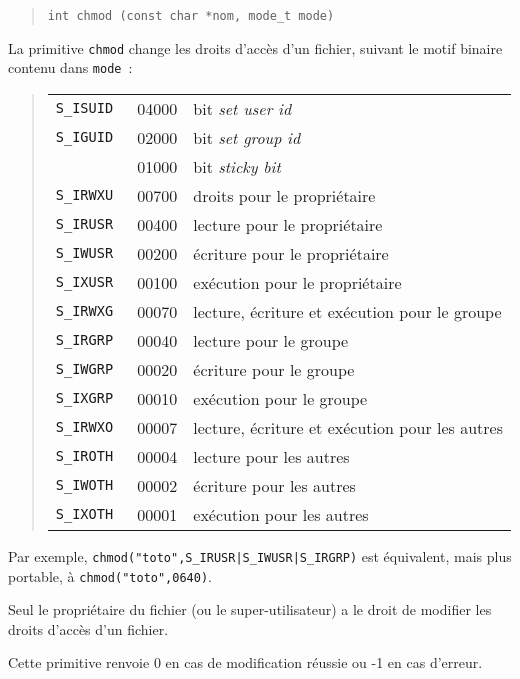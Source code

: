 \documentclass [twoside] {report}
\begin{document}
\begin {quote}
\begin {verbatim}
int chmod (const char *nom, mode_t mode)
\end{verbatim}
\end {quote}

La primitive {\tt chmod} change les droits d'accès
d'un fichier, suivant le motif binaire contenu
dans {\tt mode}~:

\begin {quote}
    \begin {tabular} {|lll|} \hline
	\tt S\_ISUID & 04000 & bit {\it set user id} \\
	\tt S\_IGUID & 02000 & bit {\it set group id} \\
	             & 01000 & bit {\it sticky bit} \\
	\tt S\_IRWXU & 00700 & droits pour le propriétaire \\
	\tt S\_IRUSR & 00400 & lecture pour le propriétaire \\
	\tt S\_IWUSR & 00200 & écriture pour le propriétaire \\
	\tt S\_IXUSR & 00100 & exécution pour le propriétaire \\
	\tt S\_IRWXG & 00070 & lecture, écriture et exécution pour le groupe \\
	\tt S\_IRGRP & 00040 & lecture pour le groupe \\
	\tt S\_IWGRP & 00020 & écriture pour le groupe \\
	\tt S\_IXGRP & 00010 & exécution pour le groupe \\
	\tt S\_IRWXO & 00007 & lecture, écriture et exécution pour les autres \\
	\tt S\_IROTH & 00004 & lecture pour les autres \\
	\tt S\_IWOTH & 00002 & écriture pour les autres \\
	\tt S\_IXOTH & 00001 & exécution pour les autres \\ \hline
    \end {tabular}
\end {quote}

Par exemple, \verb/chmod("toto",S_IRUSR|S_IWUSR|S_IRGRP)/ est
équivalent, mais plus portable, à \verb/chmod("toto",0640)/.

Seul le propriétaire du fichier (ou le
super-utilisateur) a le droit de modifier les
droits d'accès d'un fichier.

Cette primitive renvoie 0 en cas de modification
réussie ou -1 en cas d'erreur.
\end{document}
